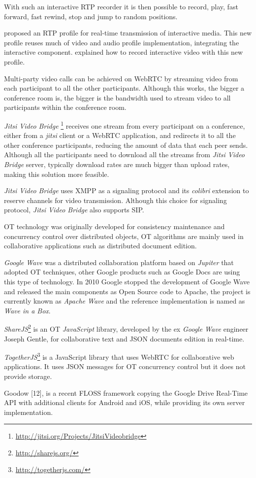 	With such an interactive \ac{RTP} recorder it is then possible to record, play, fast forward, fast rewind, stop and jump to random positions.

  \cite{interactive_stream} proposed an \ac{RTP} profile for real-time transmission of interactive media. This new profile reuses much of video and audio profile implementation, integrating the interactive component.   \cite{interactive_record} explained how to record interactive video with this new profile.
	
	Multi-party video calls can be achieved on \ac{WebRTC} by streaming video from each participant to all the other participants. Although this works, the bigger a conference room is, the bigger is the bandwidth used to stream video to all participants within the conference room.

	\emph{Jitsi Video Bridge} \footnote{\url{http://jitsi.org/Projects/JitsiVideobridge}} receives one stream from every participant on a conference, either from a \emph{jitsi} client or a \ac{WebRTC} application, and redirects it to all the other conference participants, reducing the amount of data that each peer sends. Although all the participants need to download all the streams from \emph{Jitsi Video Bridge} server, typically download rates are much bigger than upload rates, making this solution more feasible.

	\emph{Jitsi Video Bridge} uses \ac{XMPP} as a signaling protocol and its \emph{colibri} extension \cite{xep0340} to reserve channels for video transmission. Although this choice for signaling protocol, \emph{Jitsi Video Bridge} also supports \ac{SIP}.

	\ac{OT} technology was originally developed for consistency maintenance and concurrency control over distributed objects, \ac{OT} algorithms are mainly used in collaborative applications such as distributed document edition.

	\emph{Google Wave} was a distributed collaboration platform based on \emph{Jupiter}\cite{jupiter} that adopted \ac{OT} techniques, other Google products such as Google Docs are using this type of technology. In 2010 Google stopped the development of Google Wave and released the main components as Open Source code to Apache, the project is currently known as \emph{Apache Wave} and the reference implementation is named as \emph{Wave in a Box}.

	\emph{ShareJS}\footnote{\url{http://sharejs.org/}} is an \ac{OT} \emph{JavaScript} library, developed by the ex \emph{Google Wave} engineer Joseph Gentle, for collaborative text and \ac{JSON} documents edition in real-time.

	\emph{TogetherJS}\footnote{\url{http://togetherjs.com/}} is a JavaScript library that uses \ac{WebRTC} for collaborative web applications. It uses \ac{JSON} messages for \ac{OT} concurrency control but it does not provide storage.

	{\color{blue} Goodow [12], is a recent FLOSS framework copying the Google Drive Real-Time API with additional clients for Android and iOS, while providing its own server implementation.}

